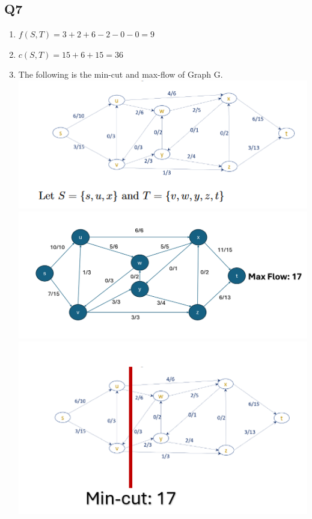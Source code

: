 \documentclass{article}
\begin{document}
\subsection*{Q7}
\begin{enumerate}[label=(\alph*)]
    \item $f(S,T) = 3+2+6-2-0-0 = 9$
    \item $c(S,T) = 15+6+15 = 36$
    \item The following is the min-cut and max-flow of Graph G.
    \subitem \includegraphics[width=.75\textwidth]{problem7.png}
    \subitem \includegraphics[width=.75\textwidth]{problem7ff.png}
    \subitem \includegraphics[width=.75\textwidth]{min-cut.png}

\end{enumerate}


\end{document}

